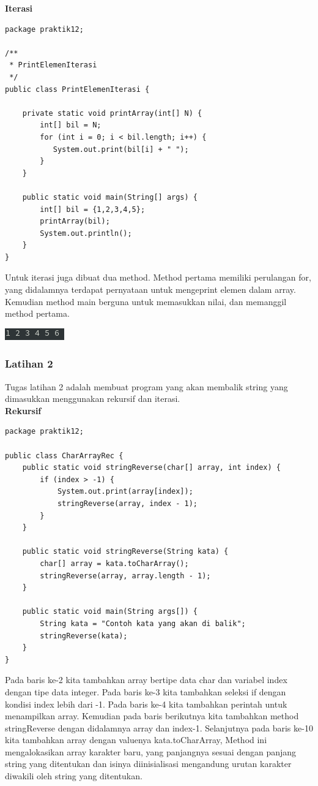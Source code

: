 \documentclass[a4paper,12pt]{article}
\begin{document}
\textbf{Iterasi\\}
\begin{lstlisting}
package praktik12;

/**
 * PrintElemenIterasi
 */
public class PrintElemenIterasi {

    private static void printArray(int[] N) {
        int[] bil = N;
        for (int i = 0; i < bil.length; i++) {
           System.out.print(bil[i] + " ");
        }
    }

    public static void main(String[] args) {
        int[] bil = {1,2,3,4,5};
        printArray(bil);
        System.out.println();
    }
}
\end{lstlisting}
Untuk iterasi juga dibuat dua method. Method pertama memiliki perulangan for, yang didalamnya terdapat pernyataan untuk
mengeprint elemen dalam array. Kemudian method main berguna untuk memasukkan nilai, dan memanggil method pertama.
\begin{center}
    \includegraphics[scale=1]{5.png} 
\end{center}

\subsubsection{Latihan 2}

Tugas latihan 2 adalah membuat program yang akan membalik string yang dimasukkan menggunakan rekursif dan iterasi.\\

\textbf{Rekursif\\}
\begin{lstlisting}
package praktik12;

public class CharArrayRec {
    public static void stringReverse(char[] array, int index) {
        if (index > -1) {
            System.out.print(array[index]);
            stringReverse(array, index - 1);
        }
    }

    public static void stringReverse(String kata) {
        char[] array = kata.toCharArray();
        stringReverse(array, array.length - 1);
    }

    public static void main(String args[]) {
        String kata = "Contoh kata yang akan di balik";
        stringReverse(kata);
    }
}
\end{lstlisting}

Pada baris ke-2 kita tambahkan array bertipe data char dan variabel index dengan tipe data integer. Pada baris ke-3 kita
tambahkan seleksi if dengan kondisi index lebih dari -1. Pada baris ke-4 kita tambahkan perintah untuk menampilkan
array. Kemudian pada baris berikutnya kita tambahkan method stringReverse dengan didalamnya array dan index-1.
Selanjutnya pada baris ke-10 kita tambahkan array dengan valuenya kata.toCharArray, Method ini mengalokasikan array
karakter baru, yang panjangnya sesuai dengan panjang string yang ditentukan dan isinya diinisialisasi mengandung urutan
karakter diwakili oleh string yang ditentukan.
\end{document}
